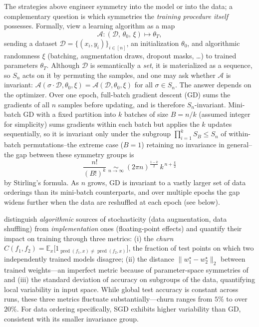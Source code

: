 \documentclass[mathematics,review,submit,moreauthors]{Definitions/mdpi}
\begin{document}
The strategies above engineer symmetry into the model or into the data; a complementary question is which symmetries the \emph{training procedure itself} possesses.
Formally, view a learning algorithm as a map
$$
\mathcal{A} : (\mathcal{D},\, \theta_0,\, \xi) \longmapsto \theta_T,
$$
sending a dataset $\mathcal{D}=\{(x_i,y_i)\}_{i\in[n]}$, an initialization $\theta_0$, and algorithmic randomness $\xi$ (batching, augmentation draws, dropout masks, \ldots) to trained parameters $\theta_T$.
Although $\mathcal{D}$ is semantically a \emph{set}, it is materialized as a sequence, so $S_n$ acts on it by permuting the samples, and one may ask whether $\mathcal{A}$ is invariant: $\mathcal{A}(\sigma\cdot\mathcal{D},\theta_0,\xi)=\mathcal{A}(\mathcal{D},\theta_0,\xi)$ for all $\sigma\in S_n$.
The answer depends on the optimizer.
Over one epoch, full-batch gradient descent (GD) sums the gradients of all $n$ samples before updating, and is therefore $S_n$-invariant.
Mini-batch GD with a fixed partition into $k$ batches of size $B=n/k$ (assumed integer for simplicity) sums gradients within each batch but applies the $k$ updates sequentially, so it is invariant only under the subgroup $\prod_{i=1}^{k} S_B \leq S_n$ of within-batch permutations--the extreme case ($B=1$) retaining no invariance in general-- the gap between these symmetry groups is
$$
\frac{n!}{(B!)^{k}} \;\underset{n\to\infty}{\sim}\; (2\pi n)^{\frac{1-k}{2}}\, k^{\,n+\frac{k}{2}}
$$
by Stirling's formula.
As $n$ grows, GD is invariant to a vastly larger set of data orderings than its mini-batch counterparts, and over multiple epochs the gap widens further when the data are reshuffled at each epoch (see below).

\citet{zhuang2022pmls} distinguish \emph{algorithmic} sources of stochasticity (data augmentation, data shuffling) from \emph{implementation} ones (floating-point effects) and quantify their impact on training through three metrics: (i) the \emph{churn} $C(f_1,f_2)=\mathbb{E}_x\big[1_{\operatorname{pred}(f_1,x)\neq \operatorname{pred}(f_2,x)}\big]$, the fraction of test points on which two independently trained models disagree; (ii) the distance $\|w_1^\star-w_2^\star\|_2$ between trained weights---an imperfect metric because of parameter-space symmetries of  and (iii) the standard deviation of accuracy on subgroups of the data, quantifying local variability in input space.
While global test accuracy is constant across runs, these three metrics fluctuate substantially---churn ranges from $5\%$ to over $20\%$.
For data ordering specifically, SGD exhibits higher variability than GD, consistent with its smaller invariance group.
\end{document}
